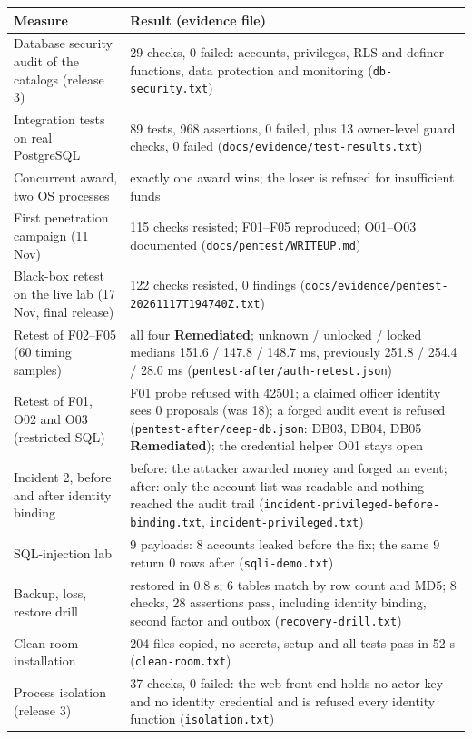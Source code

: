 \documentclass[10pt,a4paper]{article}
\newcommand{\code}[1]{\nolinkurl{#1}}
\newcommand{\fixed}{\textcolor{okgreen}{\textbf{Remediated}}}
\begin{document}
\begin{center}
\small
\begin{tabularx}{\linewidth}{@{}L{5.4cm}Y@{}}
\toprule
\textbf{Measure} & \textbf{Result (evidence file)}\\\midrule
Database security audit of the catalogs (release 3) & 29 checks, 0 failed: accounts, privileges, RLS and definer functions, data protection and monitoring (\code{db-security.txt})\\
Integration tests on real PostgreSQL & 89 tests, 968 assertions, 0 failed, plus 13 owner-level guard checks, 0 failed (\code{docs/evidence/test-results.txt})\\
Concurrent award, two OS processes & exactly one award wins; the loser is refused for insufficient funds\\
First penetration campaign (11 Nov) & 115 checks resisted; F01--F05 reproduced; O01--O03 documented (\code{docs/pentest/WRITEUP.md})\\
Black-box retest on the live lab (17 Nov, final release) & 122 checks resisted, 0 findings (\code{docs/evidence/pentest-20261117T194740Z.txt})\\
Retest of F02--F05 (60 timing samples) & all four \fixed; unknown / unlocked / locked medians 151.6 / 147.8 / 148.7 ms, previously 251.8 / 254.4 / 28.0 ms (\code{pentest-after/auth-retest.json})\\
Retest of F01, O02 and O03 (restricted SQL) & F01 probe refused with 42501; a claimed officer identity sees 0 proposals (was 18); a forged audit event is refused (\code{pentest-after/deep-db.json}: DB03, DB04, DB05 \fixed); the credential helper O01 stays open\\
Incident 2, before and after identity binding & before: the attacker awarded money and forged an event; after: only the account list was readable and nothing reached the audit trail (\code{incident-privileged-before-binding.txt}, \code{incident-privileged.txt})\\
SQL-injection lab & 9 payloads: 8 accounts leaked before the fix; the same 9 return 0 rows after (\code{sqli-demo.txt})\\
Backup, loss, restore drill & restored in 0.8 s; 6 tables match by row count and MD5; 8 checks, 28 assertions pass, including identity binding, second factor and outbox (\code{recovery-drill.txt})\\
Clean-room installation & 204 files copied, no secrets, setup and all tests pass in 52 s (\code{clean-room.txt})\\
Process isolation (release 3) & 37 checks, 0 failed: the web front end holds no actor key and no identity credential and is refused every identity function (\code{isolation.txt})\\

\end{tabularx}
\end{center}
\end{document}
